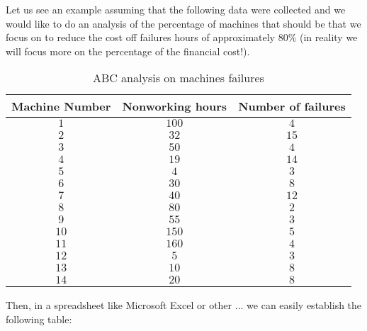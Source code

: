 	Let us see an example assuming that the following data were collected and we would like to do an analysis of the percentage of machines that should be that we focus on to reduce the cost off failures hours of approximately $80\%$ (in reality we will focus more on the percentage of the financial cost!).
	\begin{table}[H]\centering
	\begin{center}
			\begin{tabular}{|c|c|c|}
				\hline
				\multicolumn{1}{c}{\cellcolor{black!30}\textbf{Machine Number}} & 
  \multicolumn{1}{c}{\cellcolor{black!30}\textbf{Nonworking hours}} & 
  \multicolumn{1}{c}{\cellcolor{black!30}\textbf{Number of failures}} \\ \hline
				 $1$ & $100$ & $4$ \\ \hline
				 $2$ & $32$ & $15$ \\ \hline
				 $3$ & $50$ & $4$ \\ \hline
				 $4$ & $19$ & $14$ \\ \hline
				 $5$ & $4$ & $3$ \\ \hline
				 $6$ & $30$ & $8$ \\ \hline
				 $7$ & $40$ & $12$ \\ \hline
				 $8$ & $80$ & $2$ \\ \hline
				 $9$ & $55$ & $3$ \\ \hline
				 $10$ & $150$ & $5$ \\ \hline
				 $11$ & $160$ & $4$ \\ \hline
				 $12$ & $5$ & $3$ \\ \hline
				 $13$ & $10$ & $8$ \\ \hline
				 $14$ & $20$ & $8$ \\ \hline
		\end{tabular}
	\end{center}
	\caption[]{ABC analysis on machines failures}
	\end{table}
	Then, in a spreadsheet like Microsoft Excel or other ... we can easily establish the following table:
